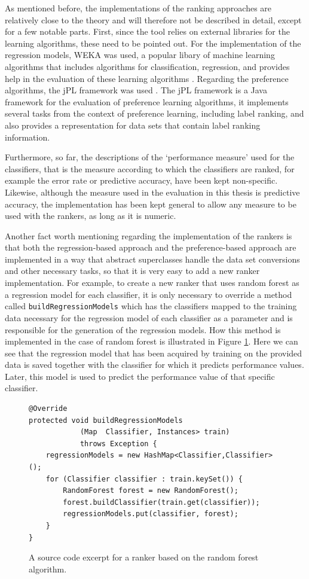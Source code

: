 As mentioned before, the implementations of the ranking approaches are relatively close to the theory and will therefore not be described in detail, except for a few notable parts. First, since the tool relies on external libraries for the learning algorithms, these need to be pointed out. For the implementation of the regression models, WEKA was used, a popular libary of machine learning algorithms that includes algorithms for classification, regression, and provides help in the evaluation of these learning algorithms \cite{hall2009weka}. Regarding the preference algorithms, the jPL framework was used \cite{intelligent2017jpl}. The jPL framework is a Java framework for the evaluation of preference learning algorithms, it implements several tasks from the context of preference learning, including label ranking, and also provides a representation for data sets that contain label ranking information. 

Furthermore, so far, the descriptions of the `performance measure' used for the classifiers, that is the measure according to which the classifiers are ranked, for example the error rate or predictive accuracy, have been kept non-specific. Likewise, although the measure used in the evaluation in this thesis is predictive accuracy, the implementation has been kept general to allow any measure to be used with the rankers, as long as it is numeric.

Another fact worth mentioning regarding the implementation of the rankers is that both the regression-based approach and the preference-based approach are implemented in a way that abstract superclasses handle the data set conversions and other necessary tasks, so that it is very easy to add a new ranker implementation. For example, to create a new ranker that uses random forest as a regression model for each classifier, it is only necessary to override a method called \texttt{buildRegressionModels} which has the classifiers mapped to the training data necessary for the regression model of each classifier as a parameter and is responsible for the generation of the regression models. How this method is implemented in the case of random forest is illustrated in Figure \ref{lst:randomForest}. Here we can see that the regression model that has been acquired by training on the provided data is saved together with the classifier for which it predicts performance values. Later, this model is used to predict the performance value of that specific classifier. 

\begin{figure}
\begin{lstlisting}
@Override
protected void buildRegressionModels
			(Map  Classifier, Instances> train) 
			throws Exception {
	regressionModels = new HashMap<Classifier,Classifier>();
	for (Classifier classifier : train.keySet()) {
		RandomForest forest = new RandomForest();
		forest.buildClassifier(train.get(classifier));
		regressionModels.put(classifier, forest);
	}
}
\end{lstlisting}
\caption{A source code excerpt for a ranker based on the random forest algorithm.}
\label{lst:randomForest}
\end{figure}

